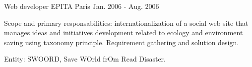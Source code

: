 \begin{cventries}
  \cventry
    {Web developer} %
    {EPITA} %
    {Paris} %
    {Jan. 2006 - Aug. 2006} %
    {
      \begin{cvitems} %
        \item {Scope and primary responsabilities: internationalization of a social web site that manages ideas and initiatives development related to ecology and environment saving using taxonomy principle. Requirement gathering and solution design.}
        \item {Entity: SWOORD, Save WOrld frOm Read Disaster.}
      \end{cvitems}
    }

\end{cventries}
